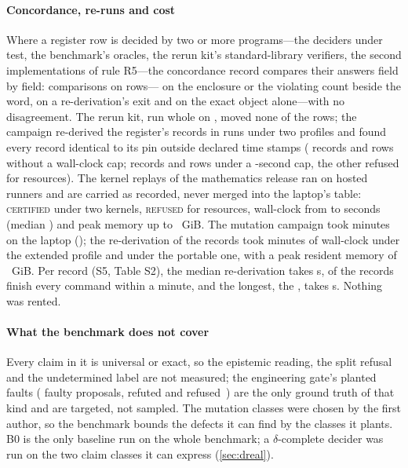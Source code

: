 \documentclass[preprint,11pt,a4paper]{elsarticle}
\theoremstyle{definition}
\newcommand{\verdict}[1]{\textup{\textsc{#1}}}
\newcommand{\CERT}{\verdict{certified}}
\newcommand{\REFS}{\verdict{refused}}
\newcommand{\supp}[1]{S#1}
\begin{document}
\paragraph{Concordance, re-runs and cost}
Where a register row is decided by two or more programs---the deciders under test, the benchmark's oracles, the rerun kit's standard-library verifiers, the second implementations of rule R5---the concordance record compares their answers field by field: \MtSaConcord{} comparisons on \MtSaConcordRows{} rows---\MtSaConcordField{} on the enclosure or the violating count beside the word, \MtSaConcordWord{} on a re-derivation's exit and \MtSaConcordObject{} on the exact object alone---with no disagreement. The rerun kit, run whole on \MtRunDate, moved none of the \MtRunRows{} rows; the campaign re-derived the register's records in \MtSaRuns{} runs under two profiles and found every record identical to its pin outside declared time stamps (\MtSaRunRecordsExt{} records and \MtSaRunRowsExt{} rows without a wall-clock cap; \MtSaRunRecordsPort{} records and \MtSaRunRowsPort{} rows under a \MtSaRunCap-second cap, the other \MtSaRunRefused{} refused for resources). The \MtSaHostedChallenges{} kernel replays of the mathematics release ran on hosted runners and are carried as recorded, never merged into the laptop's table: \MtSaHostedCertified{} \CERT{} under two kernels, \MtSaHostedRefused{} \REFS{} for resources, wall-clock from \MtSaHostedSecondsMin{} to \MtSaHostedSecondsMax{} seconds (median \MtSaHostedSecondsMedian) and peak memory up to \MtSaHostedRssGiB~GiB. The mutation campaign took \MtSaMinutes{} minutes on the laptop (\MtSaRunMachine); the re-derivation of the records took \MtSaRunWallMinutesExt{} minutes of wall-clock under the extended profile and \MtSaRunWallMinutesPort{} under the portable one, with a peak resident memory of \MtSaRunPeakGiB~GiB. Per record (\supp{5}, Table S2), the median re-derivation takes \MtRtMedianWall{} s, \MtRtUnderMinute{} of the \MtRtRecords{} records finish every command within a minute, and the longest, the \MtRtMaxLabel, takes \MtRtMaxWall{} s. Nothing was rented.

\paragraph{What the benchmark does not cover}
Every claim in it is universal or exact, so the epistemic reading, the split refusal and the undetermined label are not measured; the engineering gate's planted faults (\GFaults{} faulty proposals, \GFaultsRefuted{} refuted and \GFaultsRefused{} refused~\citep{P2}) are the only ground truth of that kind and are targeted, not sampled. The mutation classes were chosen by the first author, so the benchmark bounds the defects it can find by the classes it plants. B0 is the only baseline run on the whole benchmark; a $\delta$-complete decider was run on the two claim classes it can express (\cref{sec:dreal}).
\end{document}

